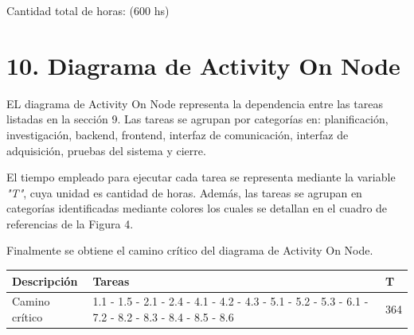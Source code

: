 \documentclass[
11pt%
]{charter}
\begin{document}
Cantidad total de horas: (600 hs)

\section{10. Diagrama de Activity On Node}
\label{sec:AoN}



EL diagrama de Activity On Node representa la dependencia entre las tareas listadas en la sección 9. Las tareas se agrupan por categorías en: planificación, investigación, backend, frontend, interfaz de comunicación, interfaz de adquisición, pruebas del sistema y cierre.

El tiempo empleado para ejecutar cada tarea se representa mediante la variable \textit{"T"}, cuya unidad es cantidad de horas. Además, las tareas se agrupan en categorías identificadas mediante colores los cuales se detallan en el cuadro de referencias de la Figura 4.

Finalmente se obtiene el camino crítico del diagrama de Activity On Node.

\begin{table}[ht]
\begin{tabularx}{\linewidth}{@{}|l|X|l|@{}}
\hline
\rowcolor[HTML]{C0C0C0} 
Descripción           & Tareas & T \\ \hline	%
Camino crítico      & 1.1 - 1.5 - 2.1 - 2.4 - 4.1 - 4.2 - 4.3 - 5.1 - 5.2 - 5.3 - 6.1 - 7.2 - 8.2 - 8.3 - 8.4 - 8.5 - 8.6      &364	%
       	\\ \hline
\end{tabularx}
\end{table}
\end{document}
